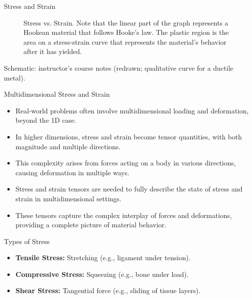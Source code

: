 \documentclass[aspectratio=169,11pt]{beamer}
\begin{document}
\begin{frame}{Stress and Strain}
\begin{figure}
\begin{tikzpicture}[scale=0.82,font=\small]
        \end{tikzpicture}
        \caption{Stress vs. Strain.
        Note that the linear part of the graph represents a Hookean material that follows Hooke's law. The plastic region is the area on a stress-strain curve that represents the material's behavior after it has yielded.}
    \end{figure}
    \vspace{-3mm}
    {\centering\tiny\color{DarkGray}Schematic: instructor's course notes (redrawn; qualitative curve for a ductile metal).\par}
\end{frame}

\begin{frame}{Multidimensional Stress and Strain}
    \begin{itemize}
        \item Real-world problems often involve multidimensional loading and deformation, beyond the 1D case.
        \item In higher dimensions, stress and strain become tensor quantities, with both magnitude and multiple directions.
        \item This complexity arises from forces acting on a body in various directions, causing deformation in multiple ways.
        \item Stress and strain tensors are needed to fully describe the state of stress and strain in multidimensional settings.
        \item These tensors capture the complex interplay of forces and deformations, providing a complete picture of material behavior.
    \end{itemize}
\end{frame}

\begin{frame}{Types of Stress}
  \begin{itemize}
    \item \textbf{Tensile Stress:} Stretching (e.g., ligament under tension).
    \item \textbf{Compressive Stress:} Squeezing (e.g., bone under load).
    \item \textbf{Shear Stress:} Tangential force (e.g., sliding of tissue layers).
  \end{itemize}
\end{frame}
\end{document}
